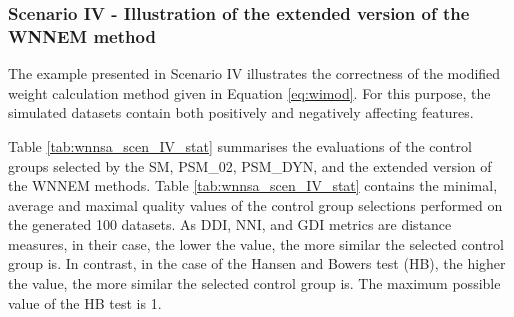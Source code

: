 		\subsubsection{Scenario IV - Illustration of the extended version of the WNNEM method}
		\label{sec:wnnsa_eval_scen_IV}
								
		The example presented in Scenario IV illustrates the correctness of the modified weight calculation method given in Equation \ref{eq:wimod}. For this purpose, the simulated datasets contain both positively and negatively affecting features. 
								
		Table \ref{tab:wnnsa_scen_IV_stat} summarises the evaluations of the control groups selected by the SM, PSM\_02, PSM\_DYN, and the extended version of the WNNEM methods. Table \ref{tab:wnnsa_scen_IV_stat} contains the minimal, average and maximal quality values of the control group selections performed on the generated 100 datasets. As DDI, NNI, and GDI metrics are distance measures, in their case, the lower the value, the more similar the selected control group is. In contrast, in the case of the Hansen and Bowers test (HB), the higher the value, the more similar the selected control group is. The maximum possible value of the HB test is 1. 
								
